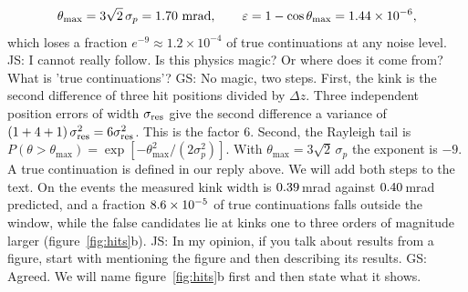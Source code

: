 \documentclass[11pt,a4paper]{article}
\newcommand{\js}[1]{{\color{blue} JS: #1 }}
\newcommand{\gs}[1]{{\color{orange!85!black} GS: #1 }}
\begin{document}
\begin{equation}
\theta_{\max}=3\sqrt2\,\sigma_p=\EpsMrad\ \text{mrad},\qquad \varepsilon=1-\cos\theta_{\max}=\EpsCos ,
\end{equation}
which loses a fraction $e^{-9}\approx1.2\times10^{-4}$ of true continuations at any noise level. \js{I cannot really follow. Is this physics magic? Or where does it come from? What is 'true continuations'?} \gs{No magic, two steps. First, the kink is the second difference of three hit positions divided by $\Delta z$. Three independent position errors of width $\sigma_{\rm res}$ give the second difference a variance of $(1+4+1)\,\sigma_{\rm res}^2=6\sigma_{\rm res}^2$. This is the factor 6. Second, the Rayleigh tail is $P(\theta>\theta_{\max})=\exp[-\theta_{\max}^2/(2\sigma_p^2)]$. With $\theta_{\max}=3\sqrt2\,\sigma_p$ the exponent is $-9$. A true continuation is defined in our reply above. We will add both steps to the text.}
On the events the measured kink width is $0.39$\,mrad against $0.40$\,mrad
predicted, and a fraction $8.6\times10^{-5}$ of true continuations falls outside the window,
while the false candidates lie at kinks one to three orders of magnitude larger
(figure~\ref{fig:hits}b). \js{In my opinion, if you talk about results from a figure, start with mentioning the figure and then describing its results.} \gs{Agreed. We will name figure~\ref{fig:hits}b first and then state what it shows.}
\end{document}
